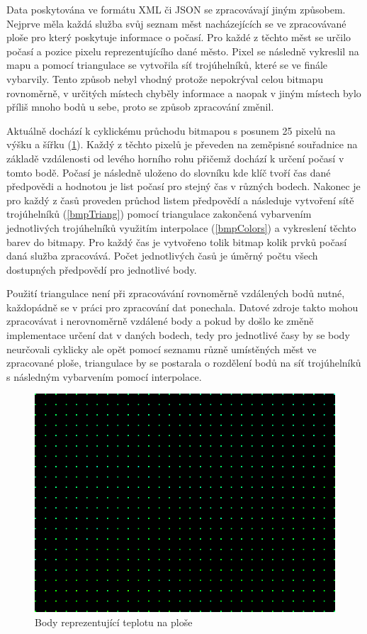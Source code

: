 \documentclass[czech,bachelor,dept460,male,csharp,cpdeclaration]{diploma}
\begin{document}
	Data poskytována ve formátu XML či JSON se zpracovávají jiným způsobem. Nejprve měla každá služba svůj seznam měst nacházejících se ve zpracovávané ploše pro který poskytuje informace o počasí. Pro každé z těchto měst se určilo počasí a pozice pixelu reprezentujícího dané město. Pixel se následně vykreslil na mapu a pomocí triangulace se vytvořila síť trojúhelníků, které se ve finále vybarvily. Tento způsob nebyl vhodný protože nepokrýval celou bitmapu rovnoměrně, v určitých místech chyběly informace a naopak v jiným místech bylo příliš mnoho bodů u sebe, proto se způsob zpracování změnil.
	
	Aktuálně dochází k cyklickému průchodu bitmapou s posunem 25 pixelů na výšku a šířku (\ref{bmpBody}). Každý z těchto pixelů je převeden na zeměpisné souřadnice na základě vzdálenosti od levého horního rohu přičemž dochází k určení počasí v tomto bodě. Počasí je následně uloženo do slovníku kde klíč tvoří čas dané předpovědi a hodnotou je list počasí pro stejný čas v různých bodech. Nakonec je pro každý z časů proveden průchod listem předpovědí a následuje vytvoření sítě trojúhelníků (\ref{bmpTriang}) pomocí triangulace zakončená vybarvením jednotlivých trojúhelníků využitím interpolace (\ref{bmpColors}) a vykreslení těchto barev do bitmapy. Pro každý čas je vytvořeno tolik bitmap kolik prvků počasí daná služba zpracovává. Počet jednotlivých časů je úměrný počtu všech dostupných předpovědí pro jednotlivé body.
	
	Použití triangulace není při zpracovávání rovnoměrně vzdálených bodů nutné, každopádně se v práci pro zpracování dat ponechala. Datové zdroje takto mohou zpracovávat i nerovnoměrně vzdálené body a pokud by došlo ke změně implementace určení dat v daných bodech, tedy pro jednotlivé časy by se body neurčovali cyklicky ale opět pomocí seznamu různě umístěných měst ve zpracované ploše, triangulace by se postarala o rozdělení bodů na síť trojúhelníků s následným vybarvením pomocí interpolace.
	
	\begin{figure}
		\centering
		\includegraphics[scale=0.5]{Data/bmp_body.png}
		\caption{Body reprezentující teplotu na ploše}
		\label{bmpBody}
	\end{figure}
	
\end{document}
